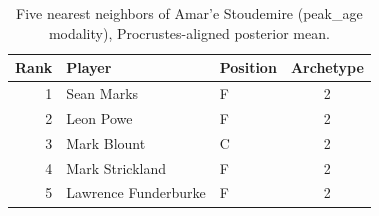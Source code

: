\begin{table}[htbp]
  \centering\small
  \begin{tabular}{rllc}
    \toprule
    Rank & Player & Position & Archetype \\
    \midrule
    1 & Sean Marks & F & 2 \\
    2 & Leon Powe & F & 2 \\
    3 & Mark Blount & C & 2 \\
    4 & Mark Strickland & F & 2 \\
    5 & Lawrence Funderburke & F & 2 \\
    \bottomrule
  \end{tabular}
  \caption{Five nearest neighbors of Amar'e Stoudemire (peak_age modality), Procrustes-aligned posterior mean.}
  \label{tab:Amar_e_Stoudemire_neighbors_peak_age}
\end{table}

